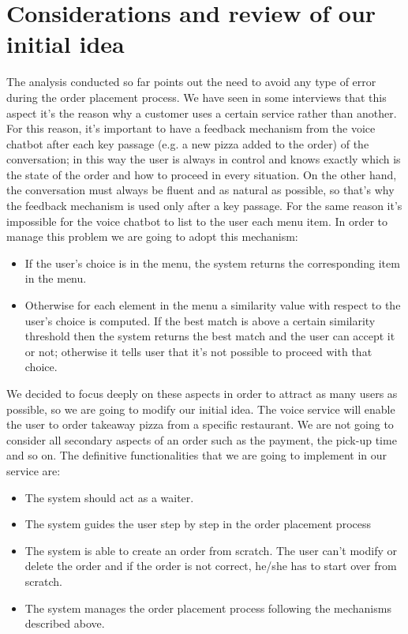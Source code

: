 \section{Considerations and review of our initial idea}

The analysis conducted so far points out the need to avoid any type of error during the order placement process. We have seen in some interviews that this aspect it's the reason why a customer uses a certain service rather than another. For this reason, it's important to have a feedback mechanism from the voice chatbot after each key passage (e.g. a new pizza added to the order) of the conversation; in this way the user is always in control and knows exactly which is the state of the order and how to proceed in every situation. 
On the other hand, the conversation must always be fluent and as natural as possible, so that's why the feedback mechanism is used only after a key passage. For the same reason it's impossible for the voice chatbot to list to the user each menu item. In order to manage this problem we are going to adopt this mechanism:

\begin{itemize}

\item If the user's choice is in the menu, the system returns the corresponding item in the menu.
\item Otherwise for each element in the menu a similarity value with respect to the user's choice is computed. If the best match is above a certain similarity threshold then the system returns the best match and the user can accept it or not; otherwise it tells user that it's not possible to proceed with that choice. 

\end{itemize}

We decided to focus deeply on these aspects in order to attract as many users as possible, so we are going to modify our initial idea. The voice service will enable the user to order takeaway pizza from a specific restaurant. We are not going to consider all secondary aspects of an order such as the payment, the pick-up time and so on. The definitive functionalities that we are going to implement in our service are:

\begin{itemize}

\item The system should act as a waiter.
\item The system guides the user step by step in the order placement process
\item The system is able to create an order from scratch. The user can't modify or delete the order and if the order is not correct, he/she has to start over from scratch.
\item The system manages the order placement process following the mechanisms described above.

\end{itemize}